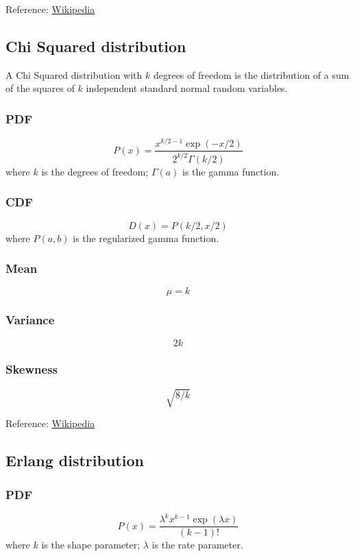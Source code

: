 Reference:
\href{https://en.wikipedia.org/wiki/Chi_distribution}{Wikipedia}

\subsection{Chi Squared distribution}

A Chi Squared distribution with $k$ degrees of freedom is the 
distribution of a sum of the squares of $k$ independent 
standard normal random variables.

\subsubsection*{PDF}
\[
    P(x) = \frac{x^{k/2-1} \exp(-x/2)}{2^{k/2} \Gamma(k/2)}
\]
where $k$ is the degrees of freedom; $\Gamma(a)$ is the gamma function.

\subsubsection*{CDF}
\[
    D(x) = P(k/2, x/2)
\]
where $P(a,b)$ is the regularized gamma function.

\subsubsection*{Mean}
\[
    \mu = k
\]

\subsubsection*{Variance}
\[
    2k
\]

\subsubsection*{Skewness}
\[
    \sqrt{8/k}
\]

Reference:
\href{https://en.wikipedia.org/wiki/Chi-squared_distribution}{Wikipedia}

\subsection{Erlang distribution}

\subsubsection*{PDF}
\[
    P(x) = \frac{\lambda^k x^{k-1} \exp{(\lambda x)}}{(k-1)!}
\]
where $k$ is the shape parameter; $\lambda$ is the rate parameter.

